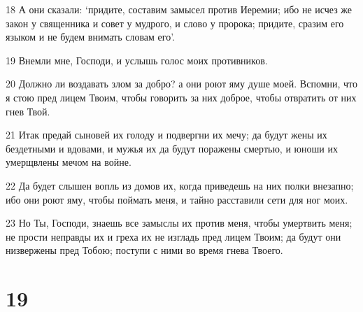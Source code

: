 \par 18 А они сказали: `придите, составим замысел против Иеремии; ибо не исчез же закон у священника и совет у мудрого, и слово у пророка; придите, сразим его языком и не будем внимать словам его'.
\par 19 Внемли мне, Господи, и услышь голос моих противников.
\par 20 Должно ли воздавать злом за добро? а они роют яму душе моей. Вспомни, что я стою пред лицем Твоим, чтобы говорить за них доброе, чтобы отвратить от них гнев Твой.
\par 21 Итак предай сыновей их голоду и подвергни их мечу; да будут жены их бездетными и вдовами, и мужья их да будут поражены смертью, и юноши их умерщвлены мечом на войне.
\par 22 Да будет слышен вопль из домов их, когда приведешь на них полки внезапно; ибо они роют яму, чтобы поймать меня, и тайно расставили сети для ног моих.
\par 23 Но Ты, Господи, знаешь все замыслы их против меня, чтобы умертвить меня; не прости неправды их и греха их не изгладь пред лицем Твоим; да будут они низвержены пред Тобою; поступи с ними во время гнева Твоего.

\chapter{19}

